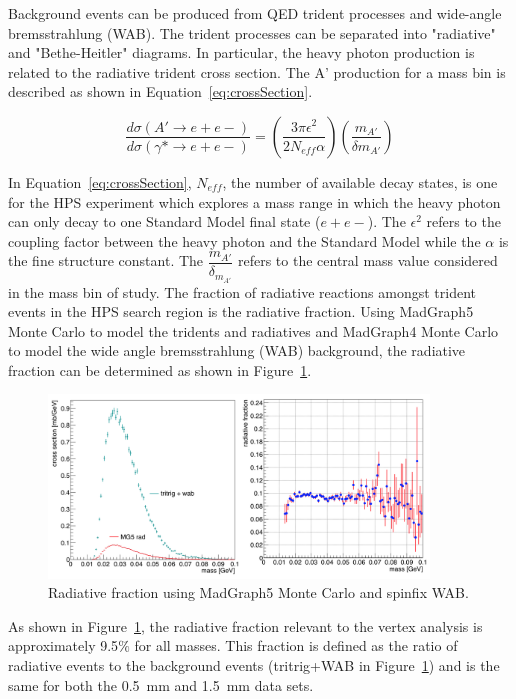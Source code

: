 
Background events can be produced from QED trident processes and wide-angle bremsstrahlung (WAB). The trident processes can be separated into "radiative" and "Bethe-Heitler" diagrams. In particular, the heavy photon production is related to the radiative trident cross section. The A' production for a mass bin is described as shown in Equation~\eqref{eq:crossSection}.

\begin{equation}
\label{eq:crossSection}
\dfrac{d\sigma(A'\rightarrow e+e-)}{d\sigma(\gamma*\rightarrow e+e-)} = \left(\dfrac{3\pi\epsilon^{2}}{2N_{eff}\alpha}\right)\left(\dfrac{m_{A'}}{\delta m_{A'}}\right)
\end{equation}

In Equation~\eqref{eq:crossSection}, $N_{eff}$, the number of available decay states, is one for the HPS experiment which explores a mass range in which the heavy photon can only decay to one Standard Model final state ($e+e-$). The $\epsilon^{2}$ refers to the coupling factor between the heavy photon and the Standard Model while the $\alpha$ is the fine structure constant. The $\dfrac{m_{A'}}{\delta_{m_{A'}}}$ refers to the central mass value considered in the mass bin of study. The fraction of radiative reactions amongst trident events in the HPS search region is the radiative fraction. Using MadGraph5 Monte Carlo to model the tridents and radiatives and MadGraph4 Monte Carlo to model the wide angle bremsstrahlung (WAB) background, the radiative fraction can be determined as shown in Figure~\ref{fig:radFrac}.

\begin{figure}[H]
  \centering
      \includegraphics[width=0.9\textwidth]{plots/radFrac.png}
  \caption{Radiative fraction using MadGraph5 Monte Carlo and spinfix WAB.}
  \label{fig:radFrac}
\end{figure} 

As shown in Figure~\ref{fig:radFrac}, the radiative fraction relevant to the vertex analysis is approximately 9.5$\%$ for all masses. This fraction is defined as the ratio of radiative events to the background events (tritrig+WAB in Figure~\ref{fig:radFrac}) and is the same for both the 0.5~mm and 1.5~mm data sets.
